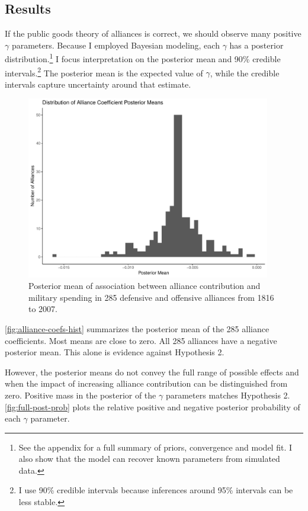 \documentclass[12pt]{article}
\begin{document}
\subsection{Results} 


If the public goods theory of alliances is correct, we should observe many positive $\gamma$ parameters. 
Because I employed Bayesian modeling, each $\gamma$ has a posterior distribution.\footnote{See the appendix for a full summary of priors, convergence and model fit. I also show that the model can recover known parameters from simulated data.} 
I focus interpretation on the posterior mean and 90\% credible intervals.\footnote{I use 90\% credible intervals because inferences around 95\% intervals can be less stable.}
The posterior mean is the expected value of $\gamma$, while the credible intervals capture uncertainty around that estimate.  


\begin{figure}[htbp]
	\centering
		\includegraphics[width=0.95\textwidth]{alliance-coefs-hist.pdf}
	\caption{Posterior mean of association between alliance contribution and military spending in 285 defensive and offensive alliances from 1816 to 2007.}
	\label{fig:alliance-coefs-hist}
\end{figure}


\autoref{fig:alliance-coefs-hist} summarizes the posterior mean of the 285 alliance coefficients. 
Most means are close to zero. 
All 285 alliances have a negative posterior mean. 
This alone is evidence against Hypothesis 2. 


However, the posterior means do not convey the full range of possible effects and when the impact of increasing alliance contribution can be distinguished from zero. 
Positive mass in the posterior of the $\gamma$ parameters matches Hypothesis 2. 
\autoref{fig:full-post-prob} plots the relative positive and negative posterior probability of each $\gamma$ parameter. 
\end{document}
